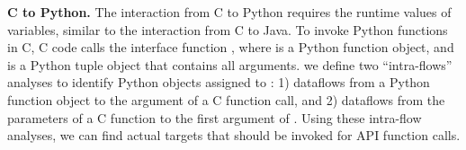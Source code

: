 \textbf{C to Python.} The interaction from C to Python requires the runtime
values of variables, similar to the interaction from C to Java. 
To invoke Python functions in C, C code calls the interface function
, where  is a Python
function object, and  is a Python tuple object that contains
all arguments. 
we define two
``intra-flows'' analyses to identify Python objects assigned to :
1) dataflows from a Python function object to the argument of a C function call,
and 2) dataflows from the parameters of a C function to the first argument of .
Using these intra-flow analyses, we can find actual targets that should be invoked
for  API function calls.


